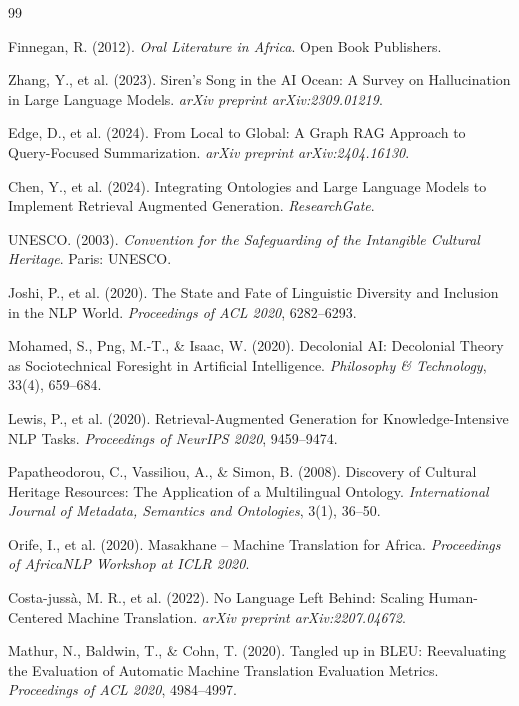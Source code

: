 \documentclass[a4paper,11pt]{article}
\begin{document}
\begin{thebibliography}{99}

Finnegan, R. (2012). \textit{Oral Literature in Africa}. Open Book Publishers.

Zhang, Y., et al. (2023). Siren's Song in the AI Ocean: A Survey on Hallucination in Large Language Models. \textit{arXiv preprint arXiv:2309.01219}.

Edge, D., et al. (2024). From Local to Global: A Graph RAG Approach to Query-Focused Summarization. \textit{arXiv preprint arXiv:2404.16130}.

Chen, Y., et al. (2024). Integrating Ontologies and Large Language Models to Implement Retrieval Augmented Generation. \textit{ResearchGate}.

UNESCO. (2003). \textit{Convention for the Safeguarding of the Intangible Cultural Heritage}. Paris: UNESCO.

Joshi, P., et al. (2020). The State and Fate of Linguistic Diversity and Inclusion in the NLP World. \textit{Proceedings of ACL 2020}, 6282–6293.

Mohamed, S., Png, M.-T., \& Isaac, W. (2020). Decolonial AI: Decolonial Theory as Sociotechnical Foresight in Artificial Intelligence. \textit{Philosophy \& Technology}, 33(4), 659–684.

Lewis, P., et al. (2020). Retrieval-Augmented Generation for Knowledge-Intensive NLP Tasks. \textit{Proceedings of NeurIPS 2020}, 9459–9474.

Papatheodorou, C., Vassiliou, A., \& Simon, B. (2008). Discovery of Cultural Heritage Resources: The Application of a Multilingual Ontology. \textit{International Journal of Metadata, Semantics and Ontologies}, 3(1), 36–50.

Orife, I., et al. (2020). Masakhane -- Machine Translation for Africa. \textit{Proceedings of AfricaNLP Workshop at ICLR 2020}.

Costa-jussà, M. R., et al. (2022). No Language Left Behind: Scaling Human-Centered Machine Translation. \textit{arXiv preprint arXiv:2207.04672}.

Mathur, N., Baldwin, T., \& Cohn, T. (2020). Tangled up in BLEU: Reevaluating the Evaluation of Automatic Machine Translation Evaluation Metrics. \textit{Proceedings of ACL 2020}, 4984–4997.


\end{thebibliography}
\end{document}
